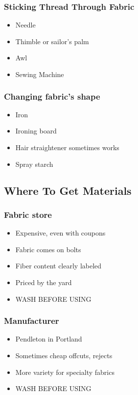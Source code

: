 \documentclass{beamer}
\begin{document}
\begin{frame}[fragile]
\frametitle{Sticking Thread Through Fabric}
\begin{itemize}
\item Needle
\item Thimble or sailor's palm
\item Awl
\item Sewing Machine
\end{itemize}
\end{frame}

\begin{frame}[fragile]
\frametitle{Changing fabric's shape}
\begin{itemize}
\item Iron
\item Ironing board
\item Hair straightener sometimes works
\item Spray starch
\end{itemize}
\end{frame}

\subsection{Where To Get Materials}

\begin{frame}[fragile]
\tableofcontents[currentsubsection]
\end{frame}


\begin{frame}[fragile]
\frametitle{Fabric store}
\begin{itemize}
\item Expensive, even with coupons
\item Fabric comes on bolts
\item Fiber content clearly labeled
\item Priced by the yard
\item WASH BEFORE USING
\end{itemize}
\end{frame}

\begin{frame}[fragile]
\frametitle{Manufacturer}
\begin{itemize}
\item Pendleton in Portland
\item Sometimes cheap offcuts, rejects
\item More variety for specialty fabrics
\item WASH BEFORE USING
\end{itemize}
\end{frame}
\end{document}
